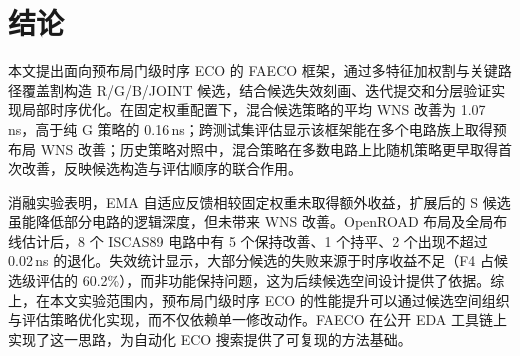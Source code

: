 \documentclass[twocolumn,10pt,fontset=windows]{ctexart}
\begin{document}
\section{结论}\label{sec:conclusion}

本文提出面向预布局门级时序 ECO 的 FAECO 框架，通过多特征加权割与关键路径覆盖割构造 R/G/B/JOINT 候选，结合候选失效刻画、迭代提交和分层验证实现局部时序优化。在固定权重配置下，混合候选策略的平均 WNS 改善为 1.07\,ns，高于纯 G 策略的 0.16\,ns；跨测试集评估显示该框架能在多个电路族上取得预布局 WNS 改善；历史策略对照中，混合策略在多数电路上比随机策略更早取得首次改善，反映候选构造与评估顺序的联合作用。

消融实验表明，EMA 自适应反馈相较固定权重未取得额外收益，扩展后的 S 候选虽能降低部分电路的逻辑深度，但未带来 WNS 改善。OpenROAD 布局及全局布线估计后，8 个 ISCAS89 电路中有 5 个保持改善、1 个持平、2 个出现不超过 0.02\,ns 的退化。失效统计显示，大部分候选的失败来源于时序收益不足（F4 占候选级评估的 60.2\%），而非功能保持问题，这为后续候选空间设计提供了依据。综上，在本文实验范围内，预布局门级时序 ECO 的性能提升可以通过候选空间组织与评估策略优化实现，而不仅依赖单一修改动作。FAECO 在公开 EDA 工具链上实现了这一思路，为自动化 ECO 搜索提供了可复现的方法基础。
\end{document}
